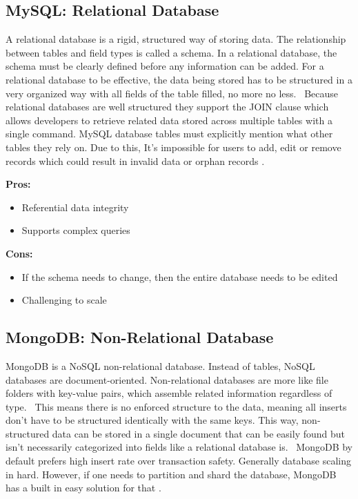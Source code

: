 \documentclass[onecolumn, draftclsnofoot,10pt, compsoc]{IEEEtran}
\begin{document}
		\subsection{MySQL: Relational Database}
			A relational database is a rigid, structured way of storing data.
			The relationship between tables and field types is called a schema. 
			In a relational database, the schema must be clearly defined before any information can be added.
			For a relational database to be effective, the data being stored has to be structured in a very organized way with all fields of the table filled, no more no less. 
			Because relational databases are well structured they support the JOIN clause which allows developers to retrieve related data stored across multiple tables with a single command.
			MySQL database tables must explicitly mention what other tables they rely on.
			Due to this, It’s impossible for users to add, edit or remove records which could result in invalid data or orphan records \cite{SQLvsNoSQLsitepoint}.
			
			\textbf{Pros:}
				\begin{itemize}
					\item{
						Referential data integrity}
					\item{
						Supports complex queries}
				\end{itemize}
			\textbf{Cons:}
				\begin{itemize}
				\item{
					If the schema needs to change, then the entire database needs to be edited \cite{SQLvsNoSQLupwork} }
				\item{
					Challenging to scale}
				
				\end{itemize}
			
		\subsection{MongoDB: Non-Relational Database}
			MongoDB is a NoSQL non-relational database.
			Instead of tables, NoSQL databases are document-oriented.
			Non-relational databases are more like file folders with key-value pairs, which assemble related information regardless of type. 
			This means there is no enforced structure to the data, meaning all inserts don't have to be structured identically with the same keys.
			This way, non-structured data can be stored in a single document that can be easily found but isn’t necessarily categorized into fields like a relational database is. 
			MongoDB by default prefers high insert rate over transaction safety. 
			Generally database scaling in hard.
			However, if one needs to partition and shard the database, MongoDB has a built in easy solution for that \cite{SQLvsNoSQLupwork}.
			
\end{document}
